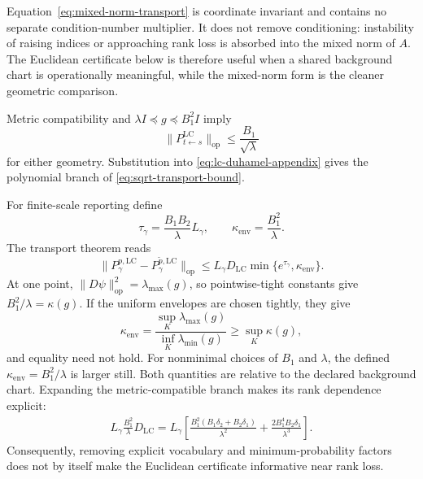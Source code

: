 \documentclass[11pt]{article}
\theoremstyle{definition}
\theoremstyle{remark}
\newcommand{\LC}{\mathrm{LC}}
\newcommand{\op}{\mathrm{op}}
\begin{document}
Equation~\eqref{eq:mixed-norm-transport} is coordinate invariant and contains no separate condition-number multiplier. It does not remove conditioning: instability of raising indices or approaching rank loss is absorbed into the mixed norm of $A$. The Euclidean certificate below is therefore useful when a shared background chart is operationally meaningful, while the mixed-norm form is the cleaner geometric comparison.

Metric compatibility and $\lambda I\preceq g\preceq B_1^2I$ imply
\begin{equation}
    \|P^{\LC}_{t\leftarrow s}\|_{\op}
    \le\frac{B_1}{\sqrt\lambda}
\end{equation}
for either geometry. Substitution into \eqref{eq:lc-duhamel-appendix} gives the polynomial branch of \eqref{eq:sqrt-transport-bound}.

For finite-scale reporting define
\begin{equation}
    \tau_\gamma=\frac{B_1B_2}{\lambda}L_\gamma,
    \qquad
    \kappa_{\mathrm{env}}=\frac{B_1^2}{\lambda}.
\end{equation}
The transport theorem reads
\begin{equation}
    \|P_\gamma^{p,\LC}-P_\gamma^{\widetilde p,\LC}\|_{\op}
    \le L_\gamma D_{\LC}
       \min\{e^{\tau_\gamma},\kappa_{\mathrm{env}}\}.
    \label{eq:finite-scale-certificate}
\end{equation}
At one point, $\|D\psi\|_{\op}^2=\lambda_{\max}(g)$, so pointwise-tight constants give $B_1^2/\lambda=\kappa(g)$. If the uniform envelopes are chosen tightly, they give
\begin{equation}
    \kappa_{\mathrm{env}}
    =\frac{\sup_K\lambda_{\max}(g)}
           {\inf_K\lambda_{\min}(g)}
    \ge\sup_K\kappa(g),
\end{equation}
and equality need not hold. For nonminimal choices of $B_1$ and $\lambda$, the
defined $\kappa_{\mathrm{env}}=B_1^2/\lambda$ is larger still. Both quantities
are relative to the declared background chart. Expanding the metric-compatible
branch makes its rank dependence explicit:
\begin{equation}
\begin{split}
    L_\gamma\frac{B_1^2}{\lambda}D_{\LC}
    =L_\gamma\left[
      \frac{B_1^2(B_1\delta_2+B_2\delta_1)}{\lambda^2}
      +\frac{2B_1^4B_2\delta_1}{\lambda^3}
    \right].
    \label{eq:expanded-polynomial-certificate}
\end{split}
\end{equation}
Consequently, removing explicit vocabulary and minimum-probability factors does not by itself make the Euclidean certificate informative near rank loss.
\end{document}
